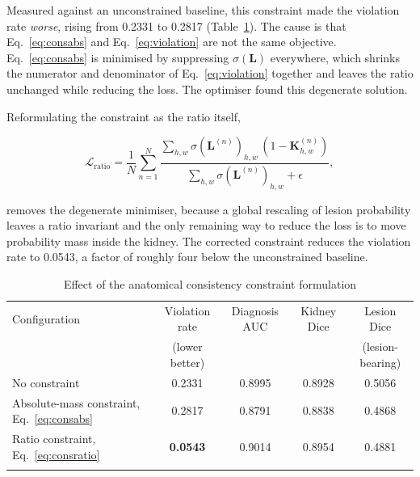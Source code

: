 \documentclass[pdflatex,sn-mathphys-num]{sn-jnl}
\theoremstyle{thmstyleone}%
\theoremstyle{thmstyletwo}%
\theoremstyle{thmstylethree}%
\begin{document}
Measured against an unconstrained baseline, this constraint made the violation rate
\emph{worse}, rising from 0.2331 to 0.2817 (Table~\ref{tab:consistency}). The cause is that
Eq.~\eqref{eq:consabs} and Eq.~\eqref{eq:violation} are not the same objective.
Eq.~\eqref{eq:consabs} is minimised by suppressing $\sigma(\mathbf{L})$ everywhere, which
shrinks the numerator and denominator of Eq.~\eqref{eq:violation} together and leaves the ratio
unchanged while reducing the loss. The optimiser found this degenerate solution.

Reformulating the constraint as the ratio itself,

\begin{equation}
\mathcal{L}_{\text{ratio}} = \frac{1}{N}\sum_{n=1}^{N}
   \frac{\sum_{h,w} \sigma(\mathbf{L}^{(n)})_{h,w}\,(1 - \mathbf{K}^{(n)}_{h,w})}
        {\sum_{h,w} \sigma(\mathbf{L}^{(n)})_{h,w} + \epsilon},
\label{eq:consratio}
\end{equation}

removes the degenerate minimiser, because a global rescaling of lesion probability leaves a
ratio invariant and the only remaining way to reduce the loss is to move probability mass inside
the kidney. The corrected constraint reduces the violation rate to 0.0543, a factor of roughly
four below the unconstrained baseline.

\begin{table}[h]
\caption{Effect of the anatomical consistency constraint formulation}\label{tab:consistency}%
\begin{tabular*}{\textwidth}{@{\extracolsep\fill}lcccc}
\toprule
Configuration & Violation rate & Diagnosis AUC & Kidney Dice & Lesion Dice \\
              & (lower better) &               &             & (lesion-bearing) \\
\midrule
No constraint                      & 0.2331 & 0.8995 & 0.8928 & 0.5056 \\
Absolute-mass constraint, Eq.~\eqref{eq:consabs}
                                   & 0.2817 & 0.8791 & 0.8838 & 0.4868 \\
Ratio constraint, Eq.~\eqref{eq:consratio}
                                   & \textbf{0.0543} & 0.9014 & 0.8954 & 0.4881 \\
\botrule
\end{tabular*}
\end{table}
\end{document}
